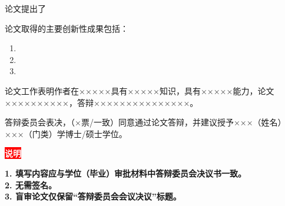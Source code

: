 \documentclass[UTF8, scheme=chinese, openany, oneside]{ctexbook}
\begin{document}
论文提出了

\vspace{3\baselineskip} %

论文取得的主要创新性成果包括：\nopagebreak %
\begin{enumerate}[leftmargin=4.5em, labelsep=0.5em, topsep=0pt, itemsep=0pt, parsep=0pt, label=\arabic*.]
    \item 
    \item 
    \item 
\end{enumerate}

\vspace{0.8cm}

论文工作表明作者在×××××具有×××××知识，具有×××××能力，论文××××××××××，答辩×××××××××××××××。

\vspace{0.3cm}

答辩委员会表决，（×票/一致）同意通过论文答辩，并建议授予×××（姓名）×××（门类）学博士/硕士学位。

\vfill %

\begin{center}
\begin{tcolorbox}[
    colback=white,
    colframe=blue,
    boxrule=1.5pt,
    sharp corners,
    width=0.9\textwidth,
    center,
    boxsep=1pt,
    top=2mm, bottom=2mm, left=3mm, right=3mm
]
    \begin{center}
    \setlength{\fboxsep}{2pt}
    \colorbox{red}{\textcolor{white}{\bfseries 说明}}
    \end{center}
    
    \vspace{1mm}
    {\bfseries\color{blue}
    1. 填写内容应与学位（毕业）审批材料中答辩委员会决议书一致。\\
    2. 无需签名。\\
    3. 盲审论文仅保留“答辩委员会会议决议”标题。}
\end{tcolorbox}
\end{center}

\vspace{0.5cm} %

\clearpage
\setcounter{page}{37}
\end{document}
